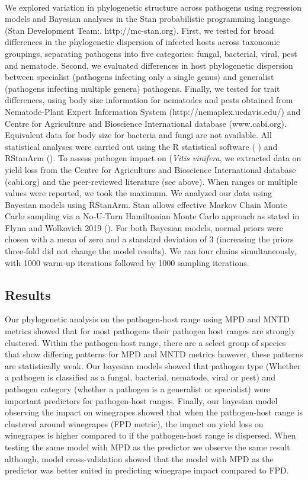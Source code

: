 \documentclass{article}
\begin{document}
\paragraph{}We explored variation in phylogenetic structure across pathogens using regression models and Bayesian analyses in the Stan probabilistic programming language (Stan Development Team:. http://mc-stan.org). First, we tested for broad differences in the phylogenetic dispersion of infected hosts across taxonomic groupings, separating pathogens into five categories: fungal, bacterial, viral, pest and nematode. Second, we evaluated differences in host phylogenetic dispersion between specialist (pathogens infecting only a single genus) and generalist (pathogens infecting multiple genera) pathogens. Finally, we tested for trait differences, using body size information for nematodes and pests obtained from Nematode-Plant Expert Information System (http://nemaplex.ucdavis.edu/) and Centre for Agriculture and Bioscience International database (www.cabi.org). Equivalent data for body size for bacteria and fungi are not available. All statistical analyses were carried out using the R statistical software (\citep{R}
) and RStanArm (\citep{RSTANARM}). To assess pathogen impact on (\textit{Vitis vinifera}, we extracted data on yield loss from the Centre for Agriculture and Bioscience International database (cabi.org) and the peer-reviewed literature (see above). When ranges or multiple values were reported, we took the maximum. We analyzed our data using Bayesian models using RStanArm. Stan allows effective Markov Chain Monte Carlo sampling via a No‐U‐Turn Hamiltonian Monte Carlo approach as stated in Flynn and Wolkovich 2019 (\citep{Flynn2018a}). For both Bayesian models, normal priors were chosen with a mean of zero and a standard deviation of 3 (increasing the priors three‐fold did not change the model results). We ran four chains simultaneously, with 1000 warm‐up iterations followed by 1000 sampling iterations.


\subsection{Results}
Our phylogenetic analysis on the pathogen-host range using MPD and MNTD metrics showed that for most pathogens their pathogen host ranges are strongly clustered. Within the pathogen-host range, there are a select group of species that show differing patterns for MPD and MNTD metrics however, these patterns are statistically weak. Our bayesian models showed that pathogen type (Whether a pathogen is classified as a fungal, bacterial, nematode, viral or pest) and pathogen category (whether a pathogen is a generalist or specialist) were important predictors for pathogen-host ranges. Finally, our bayesian model observing the impact on winegrapes showed that when the pathogen-host range is clustered around winegrapes (FPD metric), the impact on yield loss on winegrapes is higher compared to if the pathogen-host range is dispersed. When testing the same model with MPD as the predictor we observe the same result although, model cross-validation showed that the model with MPD as the predictor was better suited in predicting winegrape impact compared to FPD.
\end{document}

